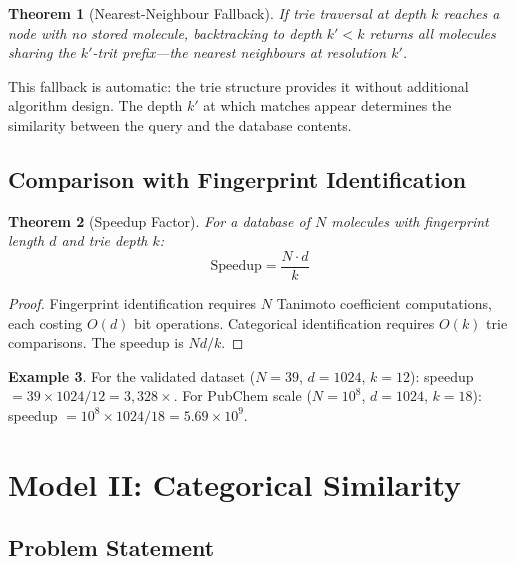\documentclass[11pt,twocolumn,a4paper]{article}
\newtheorem{theorem}{Theorem}[section]
\theoremstyle{definition}
\newtheorem{example}[theorem]{Example}
\theoremstyle{remark}
\begin{document}
\begin{theorem}[Nearest-Neighbour Fallback]
\label{thm:nn_fallback}
If trie traversal at depth $k$ reaches a node with no stored molecule, backtracking to depth $k' < k$ returns all molecules sharing the $k'$-trit prefix---the nearest neighbours at resolution $k'$.
\end{theorem}

This fallback is automatic: the trie structure provides it without additional algorithm design. The depth $k'$ at which matches appear determines the similarity between the query and the database contents.

\subsection{Comparison with Fingerprint Identification}

\begin{theorem}[Speedup Factor]
\label{thm:speedup}
For a database of $N$ molecules with fingerprint length $d$ and trie depth $k$:
\begin{equation}
\text{Speedup} = \frac{N \cdot d}{k}
\label{eq:speedup}
\end{equation}
\end{theorem}

\begin{proof}
Fingerprint identification requires $N$ Tanimoto coefficient computations, each costing $O(d)$ bit operations. Categorical identification requires $O(k)$ trie comparisons. The speedup is $Nd/k$.
\end{proof}

\begin{example}
For the validated dataset ($N = 39$, $d = 1024$, $k = 12$): speedup $= 39 \times 1024 / 12 = 3{,}328\times$. For PubChem scale ($N = 10^8$, $d = 1024$, $k = 18$): speedup $= 10^8 \times 1024 / 18 = 5.69 \times 10^9$.
\end{example}


\section{Model II: Categorical Similarity}
\label{sec:model2}

\subsection{Problem Statement}
\end{document}
